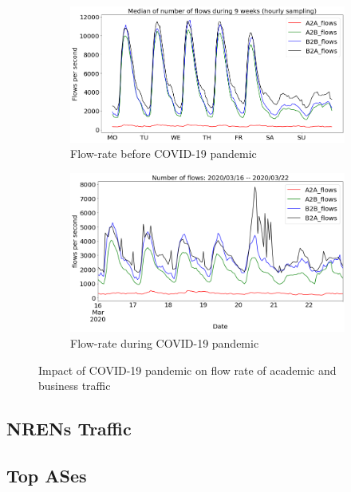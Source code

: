 \documentclass[10pt, journal, letterpaper]{IEEEtran}
\newcommand\linearFigSze{0.48}
\begin{document}
\begin{figure}
    \begin{subfigure}{\linearFigSze\textwidth}
          \centering
          \includegraphics[width=\columnwidth]{img/BCO_acaBus_fps.png}
          \caption{Flow-rate before COVID-19 pandemic}
          \label{fig:BCO_acaBus_fps}
    \end{subfigure}
    \begin{subfigure}{\linearFigSze\textwidth}
          \centering
          \includegraphics[width=\columnwidth]{img/CO2_acaBus_fps.png}
          \caption{Flow-rate during COVID-19 pandemic}
          \label{fig:CO_acaBus_fps}
    \end{subfigure}
    \caption{Impact of COVID-19 pandemic on flow rate of academic and business traffic}
    \label{fig:flowrate_acaBus_BCO_CO}
\end{figure}
\subsection{NRENs Traffic}

\subsection{Top ASes}
\end{document}
